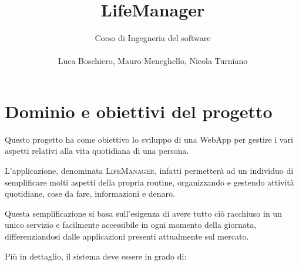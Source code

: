 \documentclass[a4paper,12pt]{article}
\title{LifeManager}
\author{
 Corso di Ingegneria del software\\ \\Luca Boschiero, Mauro Meneghello, Nicola Turniano
 }
\begin{document}
 
 \maketitle
 \thispagestyle{fancy}
 




\section*{Dominio e obiettivi del progetto}
Questo progetto ha come obiettivo lo sviluppo di una WebApp per gestire i vari aspetti relativi alla vita quotidiana di una persona. 

L'applicazione, denominata {\scshape LifeManager}, infatti permetterà ad un individuo di semplificare molti aspetti della propria routine, organizzando e gestendo attività quotidiane, cose da fare, informazioni e denaro. 

Questa semplificazione si basa sull'esigenza di avere tutto ciò racchiuso in un unico servizio e facilmente accessibile in ogni momento della giornata, differenziandosi dalle applicazioni presenti attualmente sul mercato.

Più in dettaglio, il sistema deve essere in grado di:
\end{document}
